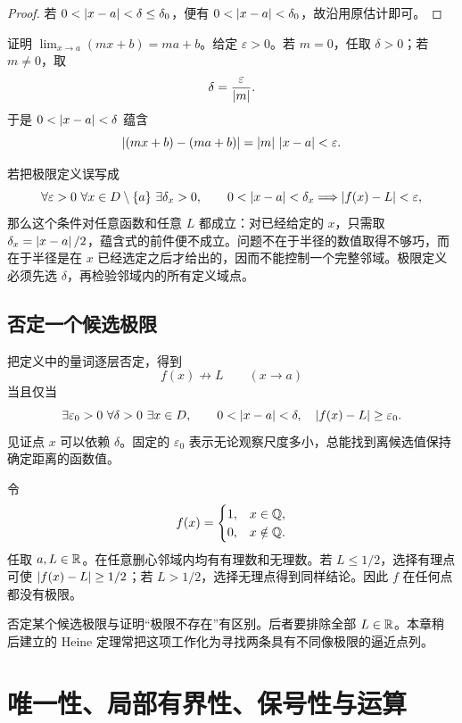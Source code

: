 \begin{proof}
若 \(0<\left|x-a\right|<\delta\le\delta_0\)，便有 \(0<\left|x-a\right|<\delta_0\)，故沿用原估计即可。
\end{proof}

\begin{example}[线性函数]
证明 \(\lim_{x\to a}(mx+b)=ma+b\)。给定 \(\varepsilon>0\)。若 \(m=0\)，任取 \(\delta>0\)；若 \(m\ne0\)，取
\[
 \delta=\frac{\varepsilon}{\left|m\right|}.
\]
于是 \(0<\left|x-a\right|<\delta\) 蕴含
\[
 \left|(mx+b)-(ma+b)\right|=\left|m\right|\,\left|x-a\right|<\varepsilon.
\]
\end{example}

\begin{counterexample}[把半径放在 \(x\) 之后]
若把极限定义误写成
\[
 \forall\varepsilon>0\ \forall x\in D\setminus\{a\}\ \exists\delta_x>0,
 \qquad
 0<\left|x-a\right|<\delta_x
 \Longrightarrow \left|f(x)-L\right|<\varepsilon,
\]
那么这个条件对任意函数和任意 \(L\) 都成立：对已经给定的 \(x\)，只需取
\(\delta_x=\left|x-a\right|/2\)，蕴含式的前件便不成立。问题不在于半径的数值取得不够巧，而在于半径是在 \(x\) 已经选定之后才给出的，因而不能控制一个完整邻域。极限定义必须先选 \(\delta\)，再检验邻域内的所有定义域点。
\end{counterexample}

\subsection{否定一个候选极限}

把定义中的量词逐层否定，得到
\[
 f(x)\not\to L\qquad(x\to a)
\]
当且仅当
\[
 \exists\varepsilon_0>0\ \forall\delta>0\ \exists x\in D,\qquad
 0<\abs{x-a}<\delta,\quad
 \abs{f(x)-L}\ge\varepsilon_0.
\]
见证点 \(x\) 可以依赖 \(\delta\)。固定的 \(\varepsilon_0\) 表示无论观察尺度多小，总能找到离候选值保持确定距离的函数值。

\begin{example}
令
\[
 f(x)=
 \begin{cases}
 1,&x\in\mathbb{Q},\\
 0,&x\notin\mathbb{Q}.
 \end{cases}
\]
任取 \(a,L\in\mathbb{R}\)。在任意删心邻域内均有有理数和无理数。若 \(L\le1/2\)，选择有理点可使 \(\left|f(x)-L\right|\ge1/2\)；若 \(L>1/2\)，选择无理点得到同样结论。因此 \(f\) 在任何点都没有极限。
\end{example}

否定某个候选极限与证明“极限不存在”有区别。后者要排除全部 \(L\in\mathbb{R}\)。本章稍后建立的 Heine 定理常把这项工作化为寻找两条具有不同像极限的逼近点列。

\section{唯一性、局部有界性、保号性与运算}

